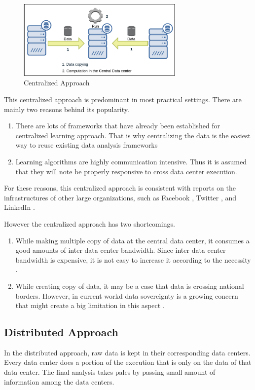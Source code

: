 \documentclass[12pt,notitlepage,oneside]{report}
\begin{document}
\begin{figure}[!htbp]
  \centering
	\includegraphics[width=3.2in]{figures/1.png}
	\caption{Centralized Approach}
	\label{centralized}
\end{figure}


This centralized approach is predominant in most practical settings. 
There are mainly two reasons behind its popularity. 
\begin{enumerate}
\item There are lots of frameworks that have already been established for centralized learning approach. That is why centralizing the data is the easiest way to reuse existing data analysis frameworks \cite{1,2,3}
\item Learning algorithms are highly communication intensive. Thus it is assumed that they will note be properly responsive to cross data center execution.
\end{enumerate}
For these reasons, this centralized approach is consistent with reports on the infrastructures of other large organizations, such as Facebook \cite{4}, Twitter \cite{5}, and LinkedIn \cite{6}. 

However the centralized approach has two shortcomings.
\begin{enumerate}
\item While making multiple copy of data at the central data center, it consumes a good amounts of inter data center bandwidth. Since inter data center bandwidth is expensive, it is not easy to increase it according to the necessity \cite{7,8,9,10}.
\item While creating copy of data, it may be a case that data is crossing national borders. However, in current workd data sovereignty is a growing concern that might create a big limitation in this aspect \cite{11,12}.

\end{enumerate}

\subsection{Distributed Approach}
In the distributed approach, raw data is kept in their corresponding data centers. Every data center does a portion of the execution that is only on the data of that data center. The final analysis takes pales by passing small amount of information among the data centers. 
\end{document}
